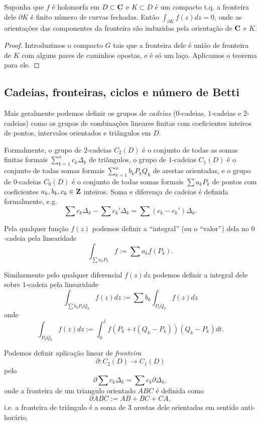 \begin{teorema}
\label{t:cauchy-k}
Suponha que $f$ é holomorfa em $D\subset \mathbf{C}$ e $K \subset D$ é um compacto t.q.
a fronteira dele $\partial K$ é finito número de curvas fechadas. Então $\int_{\partial K} f(z) dz = 0$,
onde as orientações das componentes da fronteira são induzidas pela orientação de $\mathbf{C}$ e $K$.
\end{teorema}
\begin{proof}
Introduzimos o compacto $G$ tais que a fronteira dele é união de fronteira de $K$
com alguns pares de caminhos opostas, e é só um laço.  Aplicamos o teorema para ele.
\end{proof}


\subsection{Cadeias, fronteiras,  ciclos e número de Betti}

Mais geralmente podemos definir os grupos de \emph{cadeias} ($0$-cadeias, $1$-cadeias e $2$-cadeias)
como os grupos de combinações lineares finitas com coeficientes inteiros de pontos, intervalos orientados e triângulos em $D$.

Formalmente, o grupo de $2$-cadeias $C_2(D)$ é o conjunto de todas as somas finitas formais $\sum_{k=1}^n c_k \Delta_k$ de triângulos,
o grupo de $1$-cadeias $C_1(D)$ é o conjunto de todas somas formais $\sum_{k=1}^n b_k P_kQ_k$ de arestas orientadas,
e o grupo de $0$-cadeias $C_0(D)$ é o conjunto de todas somas formais $\sum a_k P_k$ de pontos
com coeficientes $a_k,b_k,c_k \in \mathbf{Z}$ inteiros. Soma e diferença de cadeias é definida formalmente, e.g.
\[ \sum c_k \Delta_k - \sum c_k' \Delta_k = \sum (c_k - c_k') \Delta_k. \]

Pela qualquer função $f(z)$ podemos definir a ``integral'' (ou o ``valor'') dela no $0$-cadeia pela linearidade
\[ \int_{\sum a_k P_k} f := \sum a_k f(P_k). \]

Similarmente pelo qualquer diferencial $f(z) dz$ podemos definir a integral dele sobre $1$-cadeia pela linearidade
\[ \int_{\sum b_k P_kQ_k} f(z) dz := \sum b_k \int_{P_kQ_k} f(z) dz \]
onde 
\[ \int_{P_k Q_k} f(z) dz := \int_0^1 f(P_k + t(Q_k-P_k)) (Q_k-P_k) dt. \]

Podemos definir aplicação linear de \emph{fronteira}
\[ \partial: C_2(D) \to C_1(D) \]
pelo
\[ \partial \sum c_k \Delta_k = \sum c_k \partial \Delta_k, \]
onde a fronteira de um triangulo orientado $ABC$ é definida como 
\[ \partial ABC := AB + BC + CA, \]
i.e. a fronteira de triângulo é a soma de 3 arestas dele orientadas em sentido anti-horário.

